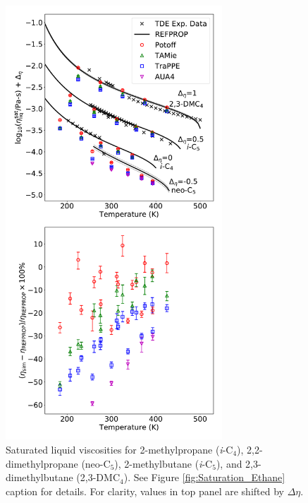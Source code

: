 \documentclass[preprint,review,12pt]{elsarticle}
\begin{document}
	\begin{figure}[htb!]
		\centering
		\includegraphics[width=3.2in]{compare_force_fields_short_branched.pdf}
		\caption{Saturated liquid viscosities for 2-methylpropane (\textit{i}-C$_{4}$), 2,2-dimethylpropane (neo-C$_{5}$), 2-methylbutane (\textit{i}-C$_{5}$), and 2,3-dimethylbutane (2,3-DMC$_4$). See Figure \ref{fig:Saturation_Ethane} caption for details. For clarity, values in top panel are shifted by $\Delta \eta$.}
		\label{fig:Saturation_short_branched}
	\end{figure} 
	
\end{document}
